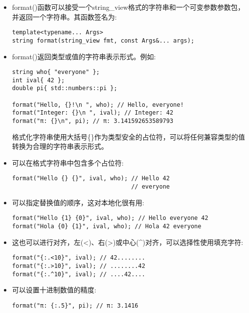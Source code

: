 \begin{itemize}
\item 
format()函数可以接受一个string\_view格式的字符串和一个可变参数参数包，并返回一个字符串。其函数签名为:

\begin{lstlisting}[style=styleCXX]
template<typename... Args>
string format(string_view fmt, const Args&... args);
\end{lstlisting}

\item 
format()返回类型或值的字符串表示形式。例如:

\begin{lstlisting}[style=styleCXX]
string who{ "everyone" };
int ival{ 42 };
double pi{ std::numbers::pi };

format("Hello, {}!\n ", who); // Hello, everyone!
format("Integer: {}\n ", ival); // Integer: 42
format("π: {}\n", pi); // π: 3.141592653589793
\end{lstlisting}

格式化字符串使用大括号\{\}作为类型安全的占位符，可以将任何兼容类型的值转换为合理的字符串表示形式。

\item 
可以在格式字符串中包含多个占位符:

\begin{lstlisting}[style=styleCXX]
format("Hello {} {}", ival, who); // Hello 42
								  // everyone
\end{lstlisting}

\item 
可以指定替换值的顺序，这对本地化很有用:

\begin{lstlisting}[style=styleCXX]
format("Hello {1} {0}", ival, who); // Hello everyone 42
format("Hola {0} {1}", ival, who); // Hola 42 everyone
\end{lstlisting}

\item 
这也可以进行对齐，左(<)、右(>)或中心(\^{})对齐，可以选择性使用填充字符:

\begin{lstlisting}[style=styleCXX]
format("{:.<10}", ival); // 42........
format("{:.>10}", ival); // ........42
format("{:.^10}", ival); // ....42....
\end{lstlisting}

\item 
可以设置十进制数值的精度:

\begin{lstlisting}[style=styleCXX]
format("π: {:.5}", pi); // π: 3.1416
\end{lstlisting}
\end{itemize}

